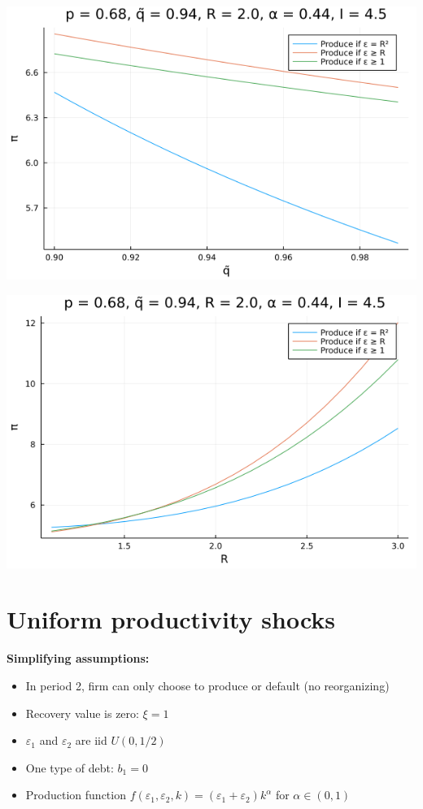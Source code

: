 \documentclass{article}
\begin{document}
\begin{center}
\includegraphics[scale = 0.5]{plot_q_tilde.png}

\includegraphics[scale = 0.5]{plot_R.png}

\end{center}

\pagebreak

\section*{Uniform productivity shocks}

\textbf{Simplifying assumptions:}

\begin{itemize}
\item In period 2, firm can only choose to produce or default (no reorganizing)
\item Recovery value is zero: $\xi = 1$
\item $\varepsilon_1$ and $\varepsilon_2$ are iid $U(0,1/2)$
\item One type of debt: $b_1 = 0$
\item Production function $f(\varepsilon_1,\varepsilon_2, k) = (\varepsilon_1+\varepsilon_2)k^\alpha$ for $\alpha \in (0,1)$
\end{itemize}
\end{document}
